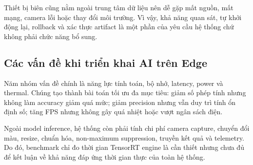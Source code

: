 Thiết bị biên cũng nằm ngoài trung tâm dữ liệu nên dễ gặp mất nguồn, mất mạng,
camera lỗi hoặc thay đổi môi trường. Vì vậy, khả năng quan sát, tự khởi động lại,
rollback và xác thực artifact là một phần của yêu cầu hệ thống chứ không phải chức
năng bổ sung.

\subsection{Các vấn đề khi triển khai AI trên Edge}

Năm nhóm vấn đề chính là năng lực tính toán, bộ nhớ, latency, power và thermal.
Chúng tạo thành bài toán tối ưu đa mục tiêu: giảm số phép tính nhưng không làm
accuracy giảm quá mức; giảm precision nhưng vẫn duy trì tính ổn định số; tăng FPS
nhưng không gây quá nhiệt hoặc vượt ngân sách điện.

Ngoài model inference, hệ thống còn phải tính chi phí camera capture, chuyển đổi
màu, resize, chuẩn hóa, non-maximum suppression, truyền kết quả và telemetry.
Do đó, benchmark chỉ đo thời gian TensorRT engine là cần thiết nhưng chưa đủ để
kết luận về khả năng đáp ứng thời gian thực của toàn hệ thống.